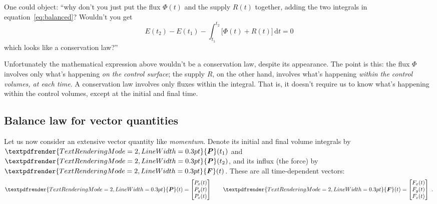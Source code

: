 \documentclass[a4paper,12pt,%
onecolumn,oneside,titlepage,%
british%
]{memoir}
\renewcommand*{\bm}[1]{\textpdfrender{TextRenderingMode=2,LineWidth=0.3pt}{\boldsymbol{#1}}}
\newcommand*{\di}{\mathrm{d}}%
\renewcommand*{\|}[1][]{\nonscript\:#1\vert\nonscript\:\mathopen{}}
\newcommand*{\yE}{E}
\newcommand*{\yH}{\varPhi}%
\newcommand*{\yR}{R}%
\newcommand*{\yP}{\bm{P}}
\newcommand*{\yF}{\bm{F}}
\begin{document}
\begin{warning}
  One could object: \enquote{why don't you just put the flux $\yH(t)$ and the supply $\yR(t)$ together, adding the two integrals in equation~\eqref{eq:balanced}? Wouldn't you get
  \begin{equation*}
    \yE(t_{2}) - \yE(t_{1}) - \int_{t_{1}}^{t_{2}}\!\!\bigl[\yH(t)+\yR(t)\bigr]\, \di t = 0
  \end{equation*}
  which looks like a conservation law?}

\smallskip

Unfortunately the mathematical expression above wouldn't be a conservation law, despite its appearance. The point is this: the flux $\yH$ involves only what's happening \emph{on the control surface}; the supply $\yR$, on the other hand, involves what's happening \emph{within the control volumes, at each time}. A conservation law involves only fluxes within the integral. That is, it doesn't require us to know what's happening within the control volumes, except at the initial and final time.
\end{warning}



\subsection{Balance law for vector quantities}
\label{sec:balance_laws_vect}

Let us now consider an extensive vector quantity like \emph{momentum}. Denote its initial and final volume integrals by $\yP(t_{1})$ and $\yP(t_{2})$, and its influx (the force) by $\yF(t)$. These are all time-dependent vectors:
\begin{equation*}
  \yP(t) =
  \begin{bmatrix}
    P_{x}(t)\\
    P_{y}(t)\\
    P_{z}(t)
  \end{bmatrix}
  \qquad
  \yF(t) =
  \begin{bmatrix}
    F_{x}(t)\\
    F_{y}(t)\\
    F_{z}(t)
  \end{bmatrix} \ .
\end{equation*}
\end{document}
